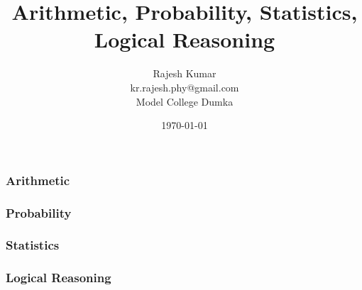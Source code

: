 \documentclass{beamer}
\title{Arithmetic, Probability, Statistics, Logical Reasoning}
\author{Rajesh Kumar\\kr.rajesh.phy@gmail.com\\Model College Dumka}
\date{\today}
\begin{document}
\frame{\titlepage}

\begin{frame}
    \frametitle{Arithmetic}
\end{frame}

\begin{frame}
    \frametitle{Probability}
\end{frame}

\begin{frame}
    \frametitle{Statistics}
\end{frame}

\begin{frame}
    \frametitle{Logical Reasoning}
\end{frame}
\end{document}
